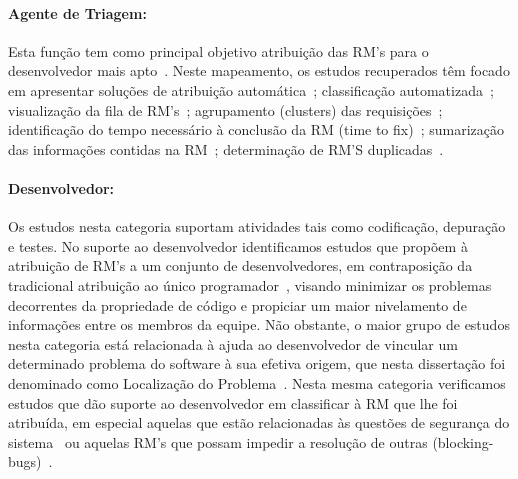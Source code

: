 \paragraph{Agente de Triagem:} Esta função tem como principal objetivo
atribuição das RM’s para o desenvolvedor mais apto~\cite{banitaan2013decoba}.
Neste mapeamento, os estudos recuperados têm focado em apresentar soluções de
atribuição automática~\cite{banitaan2013decoba, shokripour2012automatic,
	somasundaram2012automatic, Naguib2013, Zhang2014, Zanetti2013};
classificação automatizada~\cite{gegick2010identifying,liu2014faceted,
	behl2014bug, chawla2015automated,tian2015automated}; visualização da fila de
RM's~\cite{izquierdo2015gila}; agrupamento (clusters) das
requisições~\cite{liu2014faceted}; identificação do tempo necessário à conclusão
da RM (time to fix)~\cite{hosseini2012market,
	Bhattacharya:2011:BTP:1985441.1985472}; sumarização das informações contidas
na RM~\cite{mani2012ausum}; determinação de RM'S duplicadas~\cite{Sun2011,
	Wu2011a}.


\paragraph{Desenvolvedor:} Os estudos nesta categoria suportam atividades tais
como co\-di\-fi\-ca\-ção, depuração e testes. No suporte ao desenvolvedor
identificamos estudos que propõem à atribuição de RM's a um conjunto de
desenvolvedores, em contraposição da tradicional atribuição ao único
programador~\cite{banitaan2013decoba}, visando  minimizar os pro\-ble\-mas
decorrentes da propriedade de código e propiciar um maior nivelamento de
informações entre os membros da equipe. Não obstante, o maior grupo de estudos
nesta categoria está relacionada à ajuda ao desenvolvedor de vincular um
determinado problema do software à sua efetiva origem, que nesta dissertação foi
denominado como Localização do
Problema~\cite{corley2011recovering,Wong:2014:BBF:2705615.2706096,
	Thung:2014:BIT:2635868.2661678,Nguyen:2012:MAR:2393596.2393671,thung2013automatic,
	Romo:2015:TAT:2745802.2745833}. Nesta mesma categoria verificamos estudos
que dão suporte ao desenvolvedor em classificar à RM que lhe foi atribuída, em
especial aquelas que estão relacionadas às questões de segurança do
sistema~\cite{gegick2010identifying} ou aquelas RM's que possam impedir a
resolução de outras
(blocking-bugs)~\cite{ValdiviaGarcia:2014:CPB:2597073.2597099}.

